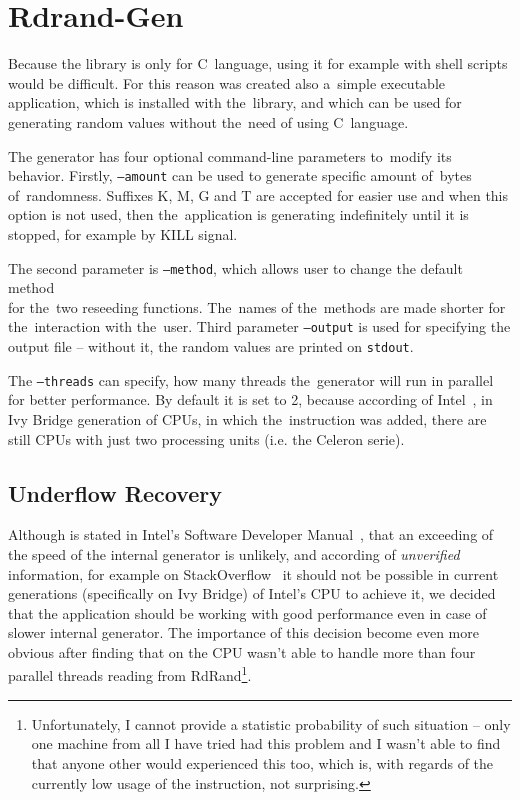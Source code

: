 
\chapter{Rdrand-Gen} \label{chap:generator}

Because the library is only for C~language, using it for example with shell scripts would be difficult. For this reason was created also a~simple executable application, which is installed with the~library, and which can be used for generating random values without the~need of using C~language.

The generator has four optional command-line parameters to~modify its behavior. Firstly, {\tt --amount} can be used to generate specific amount of~bytes of~randomness. Suffixes K, M, G and T are accepted for easier use and when this option is not used, then the~application is generating indefinitely until it is stopped, for example by KILL signal.

The second parameter is {\tt --method}, which allows user to change the default method \\ for the~two reseeding functions. The~names of the~methods are made shorter for the~interaction with the~user. Third parameter {\tt --output} is used for specifying the output file -- without it, the random values are printed on {\tt stdout}. 

The {\tt --threads} can specify, how many threads the~generator will run in parallel for better performance. By default it is set to 2, because according of Intel~\cite{IntelArk}, in Ivy Bridge generation of CPUs, in which the~instruction was added, there are still CPUs with just two processing units (i.e. the Celeron serie).

\section{Underflow Recovery}
Although is stated in Intel's Software Developer Manual~\cite[chapter~7.3.17]{IntelSWManualVol1}, that an exceeding of the speed of the internal generator is unlikely, and according of {\em unverified} information, for example on StackOverflow~\cite{StackoverflowRDRANDCharacteristics} it should not be possible in current generations (specifically on Ivy Bridge) of Intel's CPU to achieve it, we decided that the application should be working with good performance even in case of slower internal generator. The importance of this decision become even more obvious after finding that on  the CPU wasn't able to handle more than four parallel threads reading from RdRand\footnote{Unfortunately, I cannot provide a statistic probability of such situation -- only one machine from all I have tried had this problem and I wasn't able to find that anyone other would experienced this too, which is, with regards of the currently low usage of the instruction, not surprising.}.


